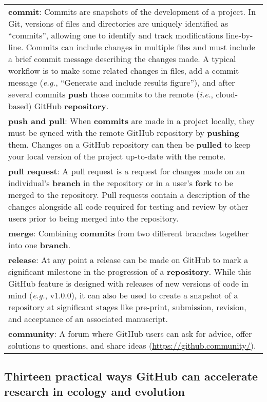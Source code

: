 \begin{tablenos:no-prefix-table-caption}
\begin{longtable}[]{@{}
  >{\raggedright\arraybackslash}p{}@{}}
\textbf{commit}: Commits are snapshots of the development of a project. In Git, versions of files and directories are uniquely identified as ``commits'', allowing one to identify and track modifications line-by-line. Commits can include changes in multiple files and must include a brief commit message describing the changes made. A typical workflow is to make some related changes in files, add a commit message (\emph{e.g.}, ``Generate and include results figure''), and after several commits \textbf{push} those commits to the remote (\emph{i.e.}, cloud-based) GitHub \textbf{repository}. \\
\textbf{push and pull}: When \textbf{commits} are made in a project locally, they must be synced with the remote GitHub repository by \textbf{pushing} them. Changes on a GitHub repository can then be \textbf{pulled} to keep your local version of the project up-to-date with the remote. \\
\textbf{pull request}: A pull request is a request for changes made on an individual's \textbf{branch} in the repository or in a user's \textbf{fork} to be merged to the repository. Pull requests contain a description of the changes alongside all code required for testing and review by other users prior to being merged into the repository. \\
\textbf{merge}: Combining \textbf{commits} from two different branches together into one \textbf{branch}. \\
\textbf{release}: At any point a release can be made on GitHub to mark a significant milestone in the progression of a \textbf{repository}. While this GitHub feature is designed with releases of new versions of code in mind (\emph{e.g.}, v1.0.0), it can also be used to create a snapshot of a repository at significant stages like pre-print, submission, revision, and acceptance of an associated manuscript. \\
\textbf{community}: A forum where GitHub users can ask for advice, offer solutions to questions, and share ideas (\url{https://github.community/}). \\
\bottomrule
\end{longtable}

\end{tablenos:no-prefix-table-caption}

\hypertarget{thirteen-practical-ways-github-can-accelerate-research-in-ecology-and-evolution}{%
\subsection{Thirteen practical ways GitHub can accelerate research in ecology and evolution}\label{thirteen-practical-ways-github-can-accelerate-research-in-ecology-and-evolution}}

